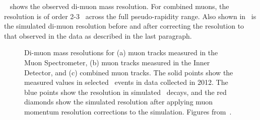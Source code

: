 
~ shows the observed di-muon mass resolution. For
combined muons, the resolution is of order 2-3 \gev\ across the full
pseudo-rapidity range. Also shown in~ is the simulated
di-muon resolution before and after correcting the resolution to that observed
in the data as described in the last paragraph.

\begin{figure}[h]
\centering
\caption{Di-muon mass resolutions for (a) muon tracks measured in the Muon
Spectrometer, (b) muon tracks measured in the Inner Detector, and (c) combined muon
tracks. The solid points show the measured values in selected \Zmm\ events in data collected in 2012. The
blue points show the resolution in simulated \Zmm\ decays, and the red diamonds
show the simulated resolution after applying muon momentum resolution corrections to the simulation. Figures from~\cite{MuonPerfPlots2012}.}
\label{fig:mu-resolution-dimu}
\end{figure}

